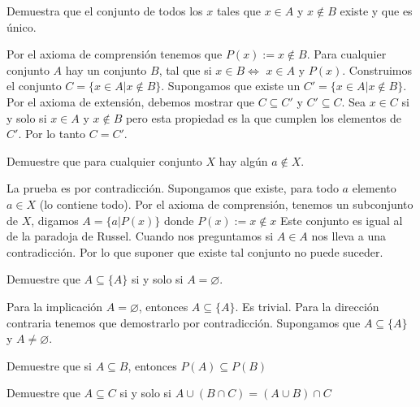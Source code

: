 \documentclass[fc]{tarea}
\begin{document}
\begin{exercise}
    Demuestra que el conjunto de todos los $x$ tales que $x \in A$ y $x \notin B$ existe y que es único.

\end{exercise}

\begin{solution}
Por el axioma de comprensión tenemos que $P(x):= x \notin B$. Para cualquier conjunto $A$ hay un conjunto $B$,
tal que si $x\in B \Leftrightarrow$ $x \in A$ y $P(x)$. Construimos el conjunto $C = \{x \in A| x\notin B\}$.
Supongamos que existe un $C'=\{x \in A| x\notin B\}$. Por el axioma de extensión, debemos mostrar que 
$C \subseteq C'$ y $C' \subseteq C$. Sea $x \in C$ si y solo si $x \in A$ y $x\notin B$
pero esta propiedad es la que cumplen los elementos de $C'$. Por lo tanto $C = C'$.
\end{solution}

\begin{exercise}
    Demuestre que para cualquier conjunto $X$ hay algún $a\notin X$.
\end{exercise}

\begin{solution}
La prueba es por contradicción. Supongamos que existe, para todo $a$ elemento $a \in X$ (lo contiene todo).
Por el axioma de comprensión, tenemos un subconjunto de $X$, digamos $A = \{a | P(x)\}$ donde $P(x):= x\notin x$
Este conjunto es igual al de la paradoja de Russel. Cuando nos preguntamos si $A \in A$ nos lleva a una contradicción.
Por lo que suponer que existe tal conjunto no puede suceder.
\end{solution}

\begin{exercise}
    Demuestre que $A\subseteq \{A\}$ si y solo si $ A = \varnothing$.
\end{exercise}

\begin{solution}
   Para la implicación $A = \varnothing$, entonces $A\subseteq \{A\}$. Es trivial. Para la dirección contraria
   tenemos que demostrarlo por contradicción. Supongamos que $A\subseteq \{A\}$ y $A \neq \varnothing$.
\end{solution}

\begin{exercise}
    Demuestre que si $A \subseteq B$, entonces $P(A) \subseteq P(B)$
\end{exercise}

\begin{exercise}
  Demuestre que $A \subseteq C$ si y solo si $A \cup (B \cap C) = (A \cup B) \cap C$  
\end{exercise}
\end{document}

